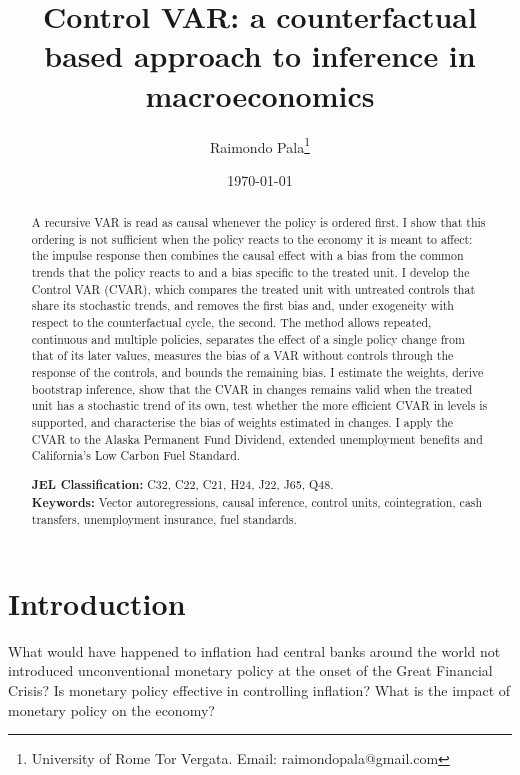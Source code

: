 \documentclass[12pt,a4paper]{article}
\title{Control VAR: a counterfactual based approach to inference in macroeconomics}
\author{Raimondo Pala\thanks{University of Rome Tor Vergata. Email: raimondopala@gmail.com}}
\date{\today}
\theoremstyle{definition}
\theoremstyle{definition}\newtheorem{example}{Example}
\theoremstyle{definition}\newtheorem{definition}{Definition}
\begin{document}
\maketitle

\begin{abstract}
\noindent A recursive VAR is read as causal whenever the policy is ordered first. I show that this ordering is not sufficient when the policy reacts to the economy it is meant to affect: the impulse response then combines the causal effect with a bias from the common trends that the policy reacts to and a bias specific to the treated unit. I develop the Control VAR (CVAR), which compares the treated unit with untreated controls that share its stochastic trends, and removes the first bias and, under exogeneity with respect to the counterfactual cycle, the second. The method allows repeated, continuous and multiple policies, separates the effect of a single policy change from that of its later values, measures the bias of a VAR without controls through the response of the controls, and bounds the remaining bias. I estimate the weights, derive bootstrap inference, show that the CVAR in changes remains valid when the treated unit has a stochastic trend of its own, test whether the more efficient CVAR in levels is supported, and characterise the bias of weights estimated in changes. I apply the CVAR to the Alaska Permanent Fund Dividend, extended unemployment benefits and California's Low Carbon Fuel Standard.

\bigskip
\noindent\textbf{JEL Classification:} C32, C22, C21, H24, J22, J65, Q48.\\
\noindent\textbf{Keywords:} Vector autoregressions, causal inference, control units, cointegration, cash transfers, unemployment insurance, fuel standards.
\end{abstract}

\newpage
\section{Introduction\label{sec:intro}}

What would have happened to inflation had central banks around the world not introduced unconventional monetary policy at the onset of the Great Financial Crisis? Is monetary policy effective in controlling inflation? What is the impact of monetary policy on the economy?
\end{document}
